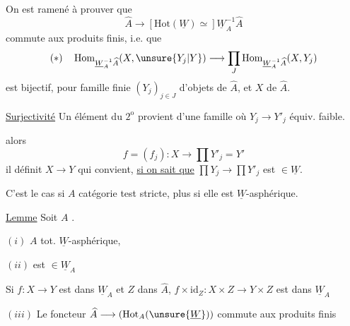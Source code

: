 
On est ramené à prouver que
\[
\widehat A\longrightarrow[\mathrm{Hot}(\underline W)\simeq]\underline W_A^{-1}\widehat A
\]
commute aux produits finis, i.e. que
\[
(*)\quad\operatorname{Hom}_{\underline W_A^{-1}\widehat A}(X,\unsure{Y_j|Y})\longrightarrow\prod_J\operatorname{Hom}_{\underline W_A^{-1}\widehat A}(X,Y_j)
\]
est bijectif, pour  famille finie $(Y_j)_{j\in J}$ d'objets de $\widehat A$, et $X$ de $\widehat A$.


\uline{Surjectivité} Un élément du $2^{\mathrm o}$  provient d'une famille
où $Y_j\longrightarrow Y'_j$ équiv. faible.

 alors
\[
f=(f_j):X\longrightarrow\prod Y'_j=Y'
\]
il définit $X\longrightarrow Y$ qui convient, \uline{si on sait que} $\prod Y_j\longrightarrow\prod Y'_j$ est $\in\underline W$.

C'est le cas si $A$ catégorie test stricte, plus  si elle est  $\underline W$-asphérique.

\uline{Lemme}  Soit $A$  . 

$(i)$ $A$  tot. $\underline W$-asphérique, 

$(ii)$  est $\in\underline W_A$

 Si $f:X\longrightarrow Y$  est dans $\underline W_A$ et $Z$ dans $\widehat A$, $f\times\mathrm{id}_Z:X\times Z\longrightarrow Y\times Z$ est dans $\underline W_A$

$(iii)$ Le foncteur $\widehat A\longrightarrow(\mathrm{Hot}_A(\unsure{\underline W}))$ commute aux produits finis

